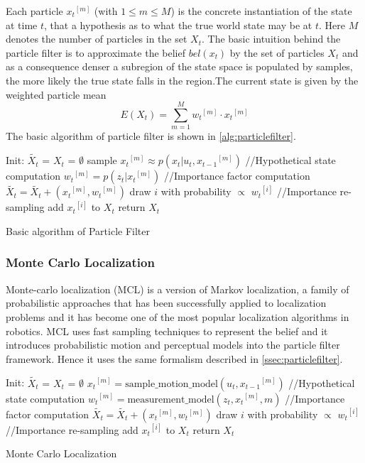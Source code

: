 {	Each particle ${x_t}^{[m]}$ (with $1 \leq m \leq M$) is the concrete instantiation of the state at time $t$, that a hypothesis as to what the true world state may be at $t$. Here $M$ denotes the number of particles in the set $X_t$. The basic intuition behind the particle filter is to approximate the belief $bel(x_t)$ by the set of particles $X_t$ and as a consequence denser a subregion of the state space is populated by samples, the more likely the true state falls in the region.The current state is given by the weighted particle mean 
\begin{equation}
E(X_t) = \sum_{m=1}^{M} {w_t}^{[m]}\cdot {x_t}^{[m]}
\end{equation}
The basic algorithm of particle filter is shown in \ref{alg:particlefilter}.\\ 
\begin{algorithm}
Init: {$\tilde{X_t}$ = $X_t$ = $\emptyset$ } \;
  { 
   sample ${x_t}^{[m]} \approx p(x_t \vert u_t,{x_{t-1}}^{[m]}) $ //Hypothetical state computation \;
   ${w_t}^{[m]} = p(z_t \vert {x_t}^{[m]} )$ //Importance factor computation\;
   $\tilde{X_t} = \tilde{X_t} + ({x_t}^{[m]},{w_t}^{[m]})$ \;
 }
  { 
   draw $i$ with probability $\varpropto$ ${w_t}^{[i]}$ //Importance re-sampling\;
   add ${x_t}^{[i]}$ to $X_t$ \;
 }
 return $X_t$
 \caption{Basic algorithm of Particle Filter}
 \label{alg:particlefilter}
\end{algorithm}
\subsubsection{Monte Carlo Localization}
\label{ssec:montecarlo}
	Monte-carlo localization (MCL)\cite{fox1999monte} is a version of Markov localization, a family of probabilistic approaches that has been successfully applied to localization problems and it has become one of the most popular localization algorithms in robotics. MCL uses fast sampling techniques to represent the belief and it introduces probabilistic motion and perceptual models into the particle filter framework. Hence it uses the same formalism described in \ref{ssec:particlefilter}.\\  	
\begin{algorithm}
Init: {$\tilde{X_t}$ = $X_t$ = $\emptyset$ } \;
  { 
   ${x_t}^{[m]} = \text{sample\_motion\_model}(u_t,{x_{t-1}}^{[m]})$ //Hypothetical state computation\;
   ${w_t}^{[m]} = \text{measurement\_model}(z_t,{x_t}^{[m]},m)$ //Importance factor computation \; 
   $\tilde{X_t} = \tilde{X_t} + ({x_t}^{[m]},{w_t}^{[m]})$ \;
 }
  { 
   draw $i$ with probability $\varpropto$ ${w_t}^{[i]}$ //Importance re-sampling\;
   add ${x_t}^{[i]}$ to $X_t$ \;
 }
 return $X_t$
 \caption{Monte Carlo Localization}
 \label{alg:montecarlo}
\end{algorithm}

}
